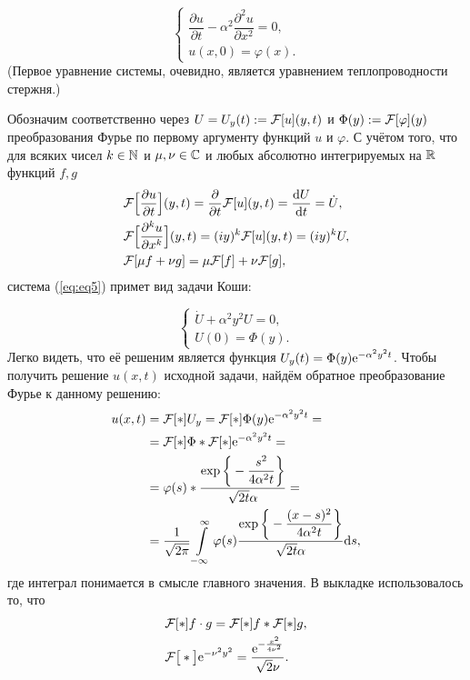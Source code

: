 \begin{equation} \label{eq:eq5}
\begin{cases}

\displaystyle
\dfrac{\partial u}{\partial t} - \alpha ^2 \dfrac{\partial ^2 u}{\partial x^2} = 0,\\
u(x, 0) = \varphi (x).

\end{cases}
\end{equation}
(Первое уравнение системы, очевидно, является уравнением теплопроводности стержня.)\par
Обозначим соответственно через $U = U_y (t) := \mathcal{F} [u](y, t)$ и $\Phi (y) := \mathcal{F} [\varphi](y)$ преобразования Фурье по первому аргументу функций $u$ и $\varphi$. С учётом того, что для всяких чисел $k \in \mathbb{N}$ и $\mu, \nu \in \mathbb{C}$ и любых абсолютно интегрируемых на $\mathbb{R}$ функций $f, g$ 
\[
\begin{split}
& \mathcal{F} \Big[  \dfrac{\partial u}{\partial t}  \Big](y, t) = \dfrac{\partial}{\partial t} \mathcal{F} [u](y, t) = \dfrac{\mathrm{d} U}{\mathrm{d} t} = \dot{U},\\
& \mathcal{F} \Big[  \dfrac{\partial ^k u}{\partial x^k}  \Big](y, t)  = (iy)^k \mathcal{F} [u](y, t) = (iy)^k U,\\
& \mathcal{F} [\mu f + \nu g] = \mu \mathcal{F} [f] + \nu \mathcal{F} [g],
\end{split}
\]
система (\ref{eq:eq5})  примет вид задачи Коши:

\begin{equation} \label{eq:eq6}
\begin{cases}
\displaystyle
\dot{U} + \alpha ^2 y^2 U = 0,\\
U(0) = \Phi (y).
\end{cases}
\end{equation}
Легко видеть, что её решеним является функция $U_y (t) = \Phi (y) \mathrm{e} ^{-\alpha ^2 y^2 t}$. Чтобы получить решение $u(x, t)$ исходной задачи, найдём обратное преобразование Фурье к данному решению:
\[
\begin{split}
\displaystyle
u(x, t) & = \mathcal{F} [*]{U_y} = \mathcal{F} [*]{\Phi (y) \mathrm{e}^{-\alpha ^2 y^2 t}} =\\
& = \mathcal{F} [*]{\Phi} * \mathcal{F} [*]{\mathrm{e}^{-\alpha ^2 y^2 t}} =\\
& = \varphi (s) * \dfrac{\exp \bigg\{ -\dfrac{s^2}{4\alpha ^2 t} \bigg\}}{\sqrt{2t} \alpha} =\\
& = \dfrac{1}{\sqrt{2 \pi}} \int \limits _{-\infty}^\infty \varphi (s) \dfrac{\exp \bigg\{ -\dfrac{(x-s)^2}{4\alpha ^2 t} \bigg\}}{\sqrt{2t} \alpha} \mathrm{d} s,
\end{split}
\]
где интеграл понимается в смысле главного значения. В выкладке использовалось то, что
\[
\begin{split}
& \mathcal{F} [*]{f \cdot g} = \mathcal{F} [*]{f} * \mathcal{F} [*]{g},\\
& \mathcal{F} \big[ * \big]{\mathrm{e}^{-\nu ^2 y^2}} = \dfrac{\mathrm{e} ^ {-\frac{x^2}{4\nu ^2}}}{\sqrt{2} \nu}.\\
\end{split}
\]

